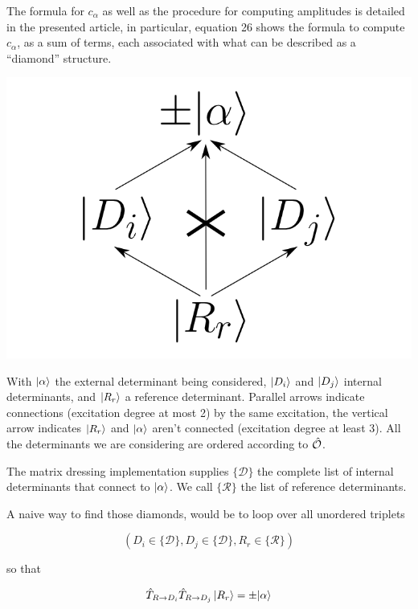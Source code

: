 \documentclass[./thesis.tex]{subfiles}
\begin{document}

The formula for $c_\alpha$ as well as the procedure for computing amplitudes is detailed in the presented article, in particular, equation 26 shows the formula to compute $c_\alpha$, as a sum of terms, each associated with what can be described as a ``diamond'' structure. 

	\begin{center}
		\includegraphics[width=0.3\columnwidth]{figures/matrix_dressing/diamond}
	\end{center}

With ${\ket{\alpha}}$ the external determinant being considered, $\ket {D_i}$ and $\ket {D_j}$ internal determinants, and $\ket {R_r}$ a reference determinant.  Parallel arrows indicate connections (excitation degree at most 2) by the same excitation, the vertical arrow indicates $\ket {R_r}$ and ${\ket{\alpha}}$ aren't connected (excitation degree at least 3). All the determinants we are considering are ordered according to ${\hat{\mathcal{O}}}$.

The matrix dressing implementation supplies $\{\mathcal{D}\}$ the complete list of internal determinants that connect to ${\ket{\alpha}}$. We call $\{\mathcal{R}\}$ the list of reference determinants.

A naive way to find those diamonds, would be to loop over all unordered triplets 

\begin{equation}
(D_i \in \{\mathcal{D}\}, D_j \in \{\mathcal{D}\}, R_r \in \{\mathcal{R}\})
\end{equation}

so that

\begin{equation}
\hat T_{R \rightarrow D_i} \hat T_{R \rightarrow D_j} \ket {R_r} = \pm {\ket{\alpha}}
\end{equation}
\end{document}

